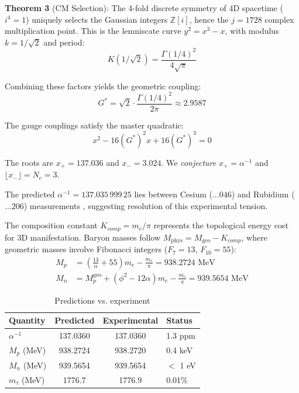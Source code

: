 \documentclass[aps,prl,twocolumn,10pt,groupedaddress,nopacs]{revtex4}
\begin{document}
\textbf{Theorem 3} (CM Selection): The 4-fold discrete symmetry of 4D spacetime ($i^4 = 1$) uniquely selects the Gaussian integers $\mathbb{Z}[i]$, hence the $j = 1728$ complex multiplication point. This is the lemniscate curve $y^2 = x^3 - x$, with modulus $k = 1/\sqrt{2}$ and period:
\begin{equation}
K(1/\sqrt{2}) = \frac{\Gamma(1/4)^2}{4\sqrt{\pi}}
\end{equation}

Combining these factors yields the geometric coupling:
\begin{equation}
G^* = \sqrt{2} \cdot \frac{\Gamma(1/4)^2}{2\pi} \approx 2.9587
\end{equation}

The gauge couplings satisfy the master quadratic:
\begin{equation}
x^2 - 16(G^*)^2 x + 16(G^*)^3 = 0
\end{equation}

The roots are $x_+ = 137.036$ and $x_- = 3.024$. We \textit{conjecture} $x_+ = \alpha^{-1}$ and $\lfloor x_- \rfloor = N_c = 3$.

The predicted $\alpha^{-1} = 137.035\,999\,25$ lies between Cesium ($...046$) and Rubidium ($...206$) measurements \cite{Morel2020}, suggesting resolution of this experimental tension.

The composition constant $K_{comp} = m_e/\pi$ represents the topological energy cost for 3D manifestation. Baryon masses follow $M_{\text{phys}} = M_{\text{geo}} - K_{comp}$, where geometric masses involve Fibonacci integers ($F_7 = 13$, $F_{10} = 55$):
\begin{align}
M_p &= \left(\frac{13}{\alpha} + 55\right)m_e - \frac{m_e}{\pi} = 938.2724 \text{ MeV} \\
M_n &= M_p^{\text{geo}} + (\phi^2 - 12\alpha)m_e - \frac{m_e}{\pi} = 939.5654 \text{ MeV}
\end{align}

\begin{table}[h]
\caption{Predictions vs. experiment}
\begin{ruledtabular}
\begin{tabular}{lccl}
Quantity & Predicted & Experimental & Status \\
\hline
$\alpha^{-1}$ & 137.0360 & 137.0360 & 1.3 ppm \\
$M_p$ (MeV) & 938.2724 & 938.2720 & 0.4 keV \\
$M_n$ (MeV) & 939.5654 & 939.5654 & $<$ 1 eV \\
$m_\tau$ (MeV) & 1776.7 & 1776.9 & 0.01\% \\
\end{tabular}
\end{ruledtabular}
\end{table}
\end{document}
